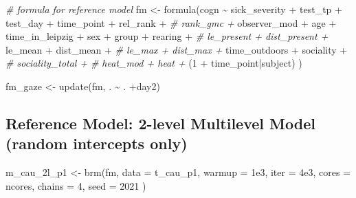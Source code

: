 \documentclass[
]{article}
\newenvironment{Shaded}{\begin{snugshade}}{\end{snugshade}}
\newcommand{\AttributeTok}[1]{\textcolor[rgb]{0.77,0.63,0.00}{#1}}
\newcommand{\CommentTok}[1]{\textcolor[rgb]{0.56,0.35,0.01}{\textit{#1}}}
\newcommand{\DecValTok}[1]{\textcolor[rgb]{0.00,0.00,0.81}{#1}}
\newcommand{\FloatTok}[1]{\textcolor[rgb]{0.00,0.00,0.81}{#1}}
\newcommand{\FunctionTok}[1]{\textcolor[rgb]{0.00,0.00,0.00}{#1}}
\newcommand{\NormalTok}[1]{#1}
\newcommand{\OtherTok}[1]{\textcolor[rgb]{0.56,0.35,0.01}{#1}}
\newcommand{\SpecialCharTok}[1]{\textcolor[rgb]{0.00,0.00,0.00}{#1}}
\begin{document}
\begin{Shaded}
\begin{Highlighting}[]
\CommentTok{\# formula for reference model}
\NormalTok{fm }\OtherTok{\textless{}{-}} \FunctionTok{formula}\NormalTok{(cogn }\SpecialCharTok{\textasciitilde{}}\NormalTok{ sick\_severity }\SpecialCharTok{+}                    
\NormalTok{                test\_tp }\SpecialCharTok{+}\NormalTok{ test\_day }\SpecialCharTok{+}\NormalTok{ time\_point }\SpecialCharTok{+}               
\NormalTok{                rel\_rank }\SpecialCharTok{+} \CommentTok{\# rank\_gmc +}
\NormalTok{                observer\_mod }\SpecialCharTok{+} 
\NormalTok{                age }\SpecialCharTok{+}\NormalTok{ time\_in\_leipzig }\SpecialCharTok{+}
\NormalTok{                sex }\SpecialCharTok{+}\NormalTok{ group }\SpecialCharTok{+}
\NormalTok{                rearing }\SpecialCharTok{+}
                \CommentTok{\# le\_present + dist\_present +}
\NormalTok{                le\_mean }\SpecialCharTok{+}\NormalTok{ dist\_mean }\SpecialCharTok{+} 
                \CommentTok{\# le\_max + dist\_max +     }
\NormalTok{                time\_outdoors }\SpecialCharTok{+}
\NormalTok{                sociality }\SpecialCharTok{+} \CommentTok{\# sociality\_total +}
                \CommentTok{\# heat\_mod + heat +}
\NormalTok{                (}\DecValTok{1} \SpecialCharTok{+}\NormalTok{ time\_point}\SpecialCharTok{|}\NormalTok{subject)                         }
\NormalTok{              )}

\NormalTok{fm\_gaze }\OtherTok{\textless{}{-}} \FunctionTok{update}\NormalTok{(fm, . }\SpecialCharTok{\textasciitilde{}}\NormalTok{ . }\SpecialCharTok{+}\NormalTok{day2)}
\end{Highlighting}
\end{Shaded}

\hypertarget{reference-model-2-level-multilevel-model-random-intercepts-only}{%
\subsection{Reference Model: 2-level Multilevel Model (random intercepts only)}\label{reference-model-2-level-multilevel-model-random-intercepts-only}}

\begin{Shaded}
\begin{Highlighting}[]
\NormalTok{m\_cau\_2l\_p1 }\OtherTok{\textless{}{-}} \FunctionTok{brm}\NormalTok{(fm, }\AttributeTok{data =}\NormalTok{ t\_cau\_p1, }
                   \AttributeTok{warmup =} \FloatTok{1e3}\NormalTok{, }\AttributeTok{iter =} \FloatTok{4e3}\NormalTok{, }\AttributeTok{cores =}\NormalTok{ ncores, }\AttributeTok{chains =} \DecValTok{4}\NormalTok{, }
                   \AttributeTok{seed =} \DecValTok{2021}
\NormalTok{                   )}
\end{Highlighting}
\end{Shaded}
\end{document}
